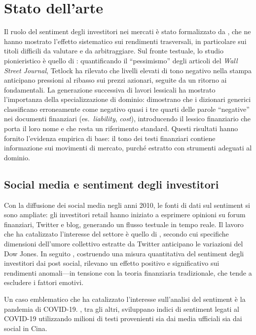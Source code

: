 \chapter{Stato dell'arte}
\label{ch:stato-dell-arte}

Il ruolo del sentiment degli investitori nei mercati è stato formalizzato da \textcite{baker2007investor}, che ne hanno mostrato l'effetto sistematico sui rendimenti trasversali, in particolare sui titoli difficili da valutare e da arbitraggiare.
Sul fronte testuale, lo studio pionieristico è quello di \textcite{tetlock2007giving}: quantificando il ``pessimismo'' degli articoli del \textit{Wall Street Journal}, Tetlock ha rilevato che livelli elevati di tono negativo nella stampa anticipano pressioni al ribasso sui prezzi azionari, seguite da un ritorno ai fondamentali.
La generazione successiva di lavori lessicali ha mostrato l'importanza della specializzazione di dominio: \textcite{loughran2011liability} dimostrano che i dizionari generici classificano erroneamente come negativo quasi i tre quarti delle parole ``negative'' nei documenti finanziari (es.\ \textit{liability}, \textit{cost}), introducendo il lessico finanziario che porta il loro nome e che resta un riferimento standard.
Questi risultati hanno fornito l'evidenza empirica di base: il tono dei testi finanziari contiene informazione sui movimenti di mercato, purché estratto con strumenti adeguati al dominio.

\section{Social media e sentiment degli investitori}

Con la diffusione dei social media negli anni 2010, le fonti di dati sul sentiment si sono ampliate: gli investitori retail hanno iniziato a esprimere opinioni su forum finanziari, Twitter e blog, generando un flusso testuale in tempo reale.
Il lavoro che ha catalizzato l'interesse del settore è quello di \textcite{bollen2011twitter}, secondo cui specifiche dimensioni dell'umore collettivo estratte da Twitter anticipano le variazioni del Dow Jones.
In seguito \textcite{mcgurk2020stock}, costruendo una misura quantitativa del sentiment degli investitori dai post social, rilevano un effetto positivo e significativo sui rendimenti anomali---in tensione con la teoria finanziaria tradizionale, che tende a escludere i fattori emotivi.

Un caso emblematico che ha catalizzato l'interesse sull'analisi del sentiment è la pandemia di COVID-19.
\textcite{duan2021covid}, tra gli altri, sviluppano indici di sentiment legati al COVID-19 utilizzando milioni di testi provenienti sia dai media ufficiali sia dai social in Cina.

